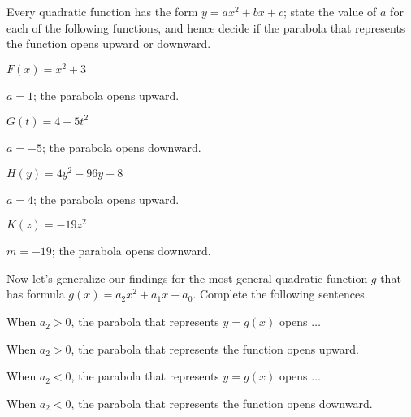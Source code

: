 \begin{essentialskills}
	\begin{problem}
	Every quadratic function has the form $y=ax^2+bx+c$; state the value 
	of $a$ for each of the following functions, and hence decide if the 
	parabola that represents the function opens upward or downward.
	\begin{multicols}{2}
		\begin{subproblem}
			$F(x)=x^2+3$ 
			\begin{shortsolution}
				$a=1$; the parabola opens upward. 
			\end{shortsolution}
		\end{subproblem}
		\begin{subproblem}
			$G(t)=4-5t^2$ 
			\begin{shortsolution}
				$a=-5$; the parabola opens downward. 
			\end{shortsolution}
		\end{subproblem}
		\begin{subproblem}
			$H(y)=4y^2-96y+8$ 
			\begin{shortsolution}
				$a=4$; the parabola opens upward. 
			\end{shortsolution}
		\end{subproblem}
		\begin{subproblem}
			$K(z)=-19z^2$ 
			\begin{shortsolution}
				$m=-19$; the parabola opens downward. 
			\end{shortsolution}
		\end{subproblem}
	\end{multicols}
	Now let's generalize our findings for the most general quadratic function $g$
	that has formula $g(x)=a_2x^2+a_1x+a_0$. Complete the following sentences.
	\begin{subproblem}
		When $a_2>0$, the parabola that represents $y=g(x)$ opens $\ldots$ 
		\begin{shortsolution}
			When $a_2>0$, the parabola that represents the function opens upward.
		\end{shortsolution}
	\end{subproblem}
	\begin{subproblem}
		When $a_2<0$, the parabola that represents $y=g(x)$ opens $\ldots$ 
		\begin{shortsolution}
			When $a_2<0$, the parabola that represents the function opens downward.
		\end{shortsolution}
	\end{subproblem}
	\end{problem}
\end{essentialskills}

